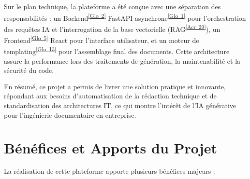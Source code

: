 \documentclass[12pt, a4paper]{report}
\newcommand{\acref}[1]{\textsuperscript{\hyperlink{acr:#1}{[Acr~#1]}}}
\newcommand{\gloref}[1]{\textsuperscript{\hyperlink{glo:#1}{[Glo~#1]}}}
\begin{document}
Sur le plan technique, la plateforme a été conçue avec une séparation des responsabilités : un Backend\gloref{2} FastAPI asynchrone\gloref{1} pour l'orchestration des requêtes IA et l'interrogation de la base vectorielle (RAG\acref{29}), un Frontend\gloref{5} React pour l'interface utilisateur, et un moteur de templating\gloref{13} pour l'assemblage final des documents. Cette architecture assure la performance lors des traitements de génération, la maintenabilité et la sécurité du code.

En résumé, ce projet a permis de livrer une solution pratique et innovante, répondant aux besoins d’automatisation de la rédaction technique et de standardisation des architectures IT, ce qui montre l'intérêt de l'IA générative pour l'ingénierie documentaire en entreprise.

\section*{Bénéfices et Apports du Projet}

La réalisation de cette plateforme apporte plusieurs bénéfices majeurs :
\end{document}
